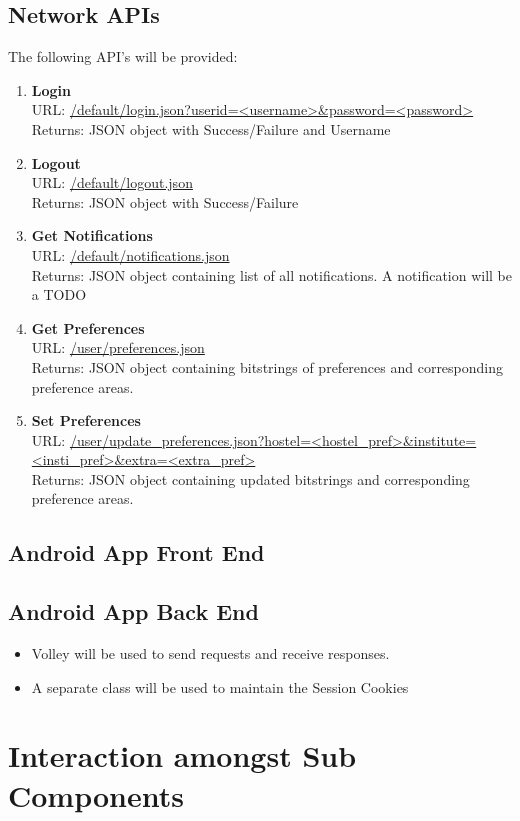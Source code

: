 \documentclass{article}
\begin{document}
			\subsection{Network APIs}
				The following API's will be provided:
				\begin{enumerate}
					\item \textbf{Login} \\
						URL: \url{/default/login.json?userid=<username>&password=<password>}  \\
						Returns: JSON object with Success/Failure and Username
					\item \textbf{Logout} \\
						URL: \url{/default/logout.json} \\
						Returns: JSON object with Success/Failure
					\item \textbf{Get Notifications} \\
						URL: \url{/default/notifications.json} \\
						Returns: JSON object containing list of all notifications. 
						A notification will be a TODO 
					\item \textbf{Get Preferences} \\
						URL: \url{/user/preferences.json} \\
						Returns: JSON object containing bitstrings of preferences and corresponding preference areas.
					\item \textbf{Set Preferences} \\
						URL: \url{/user/update_preferences.json?hostel=<hostel_pref>&institute=<insti_pref>&extra=<extra_pref>} \\
						Returns:  JSON object containing updated bitstrings and corresponding preference areas.
				\end{enumerate}
			\subsection{Android App Front End}
			\subsection{Android App Back End}
			\begin{itemize}
			\item Volley will be used to send requests and receive responses.
			\item A separate class will be used to maintain the Session Cookies
			\end{itemize}
	\section{Interaction amongst Sub Components}
\end{document}
